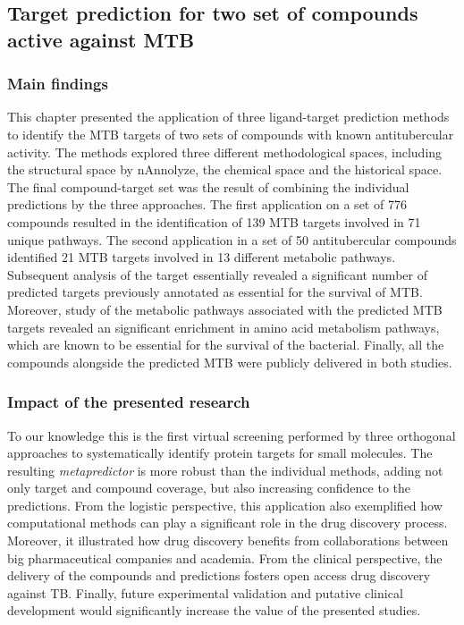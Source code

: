 \documentclass[11pt, b5paper,twoside]{tesi_upf}
\begin{document}
  \subsection{Target prediction for two set of compounds active against MTB}
  

\subsubsection{Main findings} 
\par This chapter presented the application of three ligand-target prediction methods to identify the MTB targets of two sets of compounds with known antitubercular activity. The methods explored three different methodological spaces, including the structural space by nAnnolyze, the chemical space and the historical space. The final compound-target set was the result of combining the individual predictions by the three approaches. The first application on a set of 776 compounds resulted in the identification of 139 MTB targets involved in 71 unique pathways. The second application in a set of 50 antitubercular compounds identified 21 MTB targets involved in 13 different metabolic pathways. Subsequent analysis of the target essentially revealed a significant number of predicted targets previously annotated as essential for the survival of MTB. Moreover, study of the metabolic pathways associated with the predicted MTB targets revealed an significant enrichment in amino acid metabolism pathways, which are known to be essential for the survival of the bacterial. Finally, all the compounds alongside the predicted MTB were publicly delivered in both studies. 
 
 \subsubsection{Impact of the presented research} 
 
 
\par To our knowledge this is the first virtual screening performed by three orthogonal approaches to systematically identify protein targets for small molecules. The resulting \textit{metapredictor} is more robust than the individual methods, adding not only target and compound coverage, but also increasing confidence to the predictions. From the logistic perspective, this application also exemplified how computational methods can play a significant role in the drug discovery process. Moreover, it illustrated how drug discovery benefits from collaborations between big pharmaceutical companies and academia. From the clinical perspective, the delivery of the compounds and predictions fosters open access drug discovery against TB. Finally, future experimental validation and putative clinical development would significantly increase the value of the presented studies.  
\end{document}
